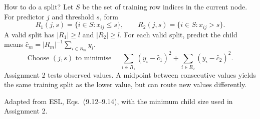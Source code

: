 \documentclass[10pt]{beamer}
\begin{document}



\begin{frame}{How to do a split?}
Let $S$ be the set of training row indices in the current node. For predictor $j$ and threshold $s$, form
\[
R_1(j,s)=\{i\in S:x_{ij}\leq s\},\qquad
R_2(j,s)=\{i\in S:x_{ij}>s\}.
\]
A valid split has $|R_1|\geq l$ and $|R_2|\geq l$.
For each valid split, predict the child means
$\hat c_m=|R_m|^{-1}\sum_{i\in R_m}y_i$.
\[
\text{Choose } (j,s) \text{ to minimise }\quad
\sum_{i\in R_1}(y_i-\hat c_1)^2+\sum_{i\in R_2}(y_i-\hat c_2)^2.
\]
Assignment 2 tests observed values. A midpoint between consecutive values yields the same training split as the lower value, but can route new values differently.

{\small Adapted from ESL, Eqs.\ (9.12--9.14), with the minimum child size used in Assignment 2.}
\end{frame}
\end{document}
